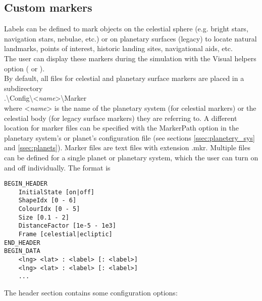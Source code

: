 \documentclass[Orbiter Developer Manual.tex]{subfiles}
\begin{document}
\subsection{Custom markers}
\label{ssec:custom_markers}

\noindent
Labels can be defined to mark objects on the celestial sphere (e.g. bright stars, navigation stars, nebulae, etc.) or on planetary surfaces (legacy) to locate natural landmarks, points of interest, historic landing sites, navigational aids, etc.\\
The user can display these markers during the simulation with the Visual helpers option ( or \Alt{}).\\
By default, all files for celestial and planetary surface markers are placed in a subdirectory\\
\indent .\textbackslash Config\textbackslash <\textit{name}>\textbackslash Marker\\
where <\textit{name}> is the name of the planetary system (for celestial markers) or the celestial body (for legacy surface markers) they are referring to. A different location for marker files can be specified with the MarkerPath option in the planetary system's or planet's configuration file (see sections \ref{ssec:planetery_sys} and \ref{ssec:planets}). Marker files are text files with extension .mkr. Multiple files can be defined for a single planet or planetary system, which the user can turn on and off individually. The format is

\begin{lstlisting}[language=OSFS]
BEGIN_HEADER
	InitialState [on|off]
	ShapeIdx [0 - 6]
	ColourIdx [0 - 5]
	Size [0.1 - 2]
	DistanceFactor [1e-5 - 1e3]
	Frame [celestial|ecliptic]
END_HEADER
BEGIN_DATA
	<lng> <lat> : <label> [: <label>]
	<lng> <lat> : <label> [: <label>]
	...
\end{lstlisting}

\noindent
The header section contains some configuration options:
\end{document}
